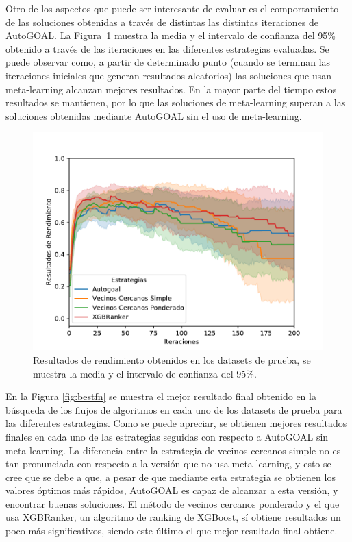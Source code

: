 Otro de los aspectos que puede ser interesante de evaluar es el comportamiento de las soluciones obtenidas a través de distintas las distintas iteraciones de AutoGOAL. La Figura~\ref{fig:performance} muestra la media y el intervalo de confianza del 95\% obtenido a través de las iteraciones en las diferentes estrategias evaluadas. Se puede observar como, a partir de determinado punto (cuando se terminan las iteraciones iniciales que generan resultados aleatorios) las soluciones que usan meta-learning alcanzan mejores resultados. En la mayor parte del tiempo estos resultados se mantienen, por lo que las soluciones de meta-learning superan a las soluciones obtenidas mediante AutoGOAL sin el uso de meta-learning.

\begin{figure}[H]
\centering
\includegraphics[scale=.75]{Figures/performance}
\caption{Resultados de rendimiento obtenidos en los datasets de prueba, se muestra la media y el intervalo de confianza del 95\%.}
\label{fig:performance}
\end{figure}

En la Figura \ref{fig:bestfn} se muestra el mejor resultado final obtenido en la búsqueda de los flujos de algoritmos en cada uno de los datasets de prueba para las diferentes estrategias. Como se puede apreciar, se obtienen mejores resultados finales en cada uno de las estrategias seguidas con respecto a AutoGOAL sin meta-learning. La diferencia entre la estrategia de vecinos cercanos simple no es tan pronunciada con respecto a  la versión que no usa meta-learning, y esto se cree que se debe a que, a pesar de que mediante esta estrategia se obtienen los valores óptimos más rápidos, AutoGOAL es capaz de alcanzar a esta versión, y encontrar buenas soluciones. El método de vecinos cercanos ponderado y el que usa XGBRanker, un algoritmo de ranking de XGBoost, sí obtiene resultados un poco más significativos, siendo este último el que mejor resultado final obtiene.

